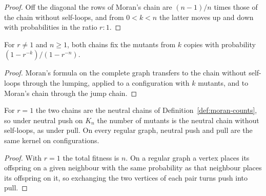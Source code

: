\begin{proof}\leanok
Off the diagonal the rows of Moran's chain are $(n-1)/n$ times those of the chain without
self-loops, and from $0<k<n$ the latter moves up and down with probabilities in the ratio $r:1$.
\end{proof}
\begin{theorem}\label{thm:selection-fixation}
\leanok{}
For $r\neq1$ and $n\ge1$, both chains fix the mutants from $k$ copies with probability
$(1-r^{-k})/(1-r^{-n})$.
\end{theorem}
\begin{proof}\leanok
Moran's formula on the complete graph transfers to the chain without self-loops through the
lumping, applied to a configuration with $k$ mutants, and to Moran's chain through the jump chain.
\end{proof}
\begin{theorem}\label{thm:push-pull-regular}
\leanok{}
For $r=1$ the two chains are the neutral chains of Definition~\ref{def:moran-counts}, so under
neutral push on $K_n$ the number of mutants is the neutral chain without self-loops, as under
pull. On every regular graph, neutral push and pull are the same kernel on configurations.
\end{theorem}
\begin{proof}\leanok
With $r=1$ the total fitness is $n$. On a regular graph a vertex places its offspring on a given
neighbour with the same probability as that neighbour places its offspring on it, so exchanging
the two vertices of each pair turns push into pull.
\end{proof}

